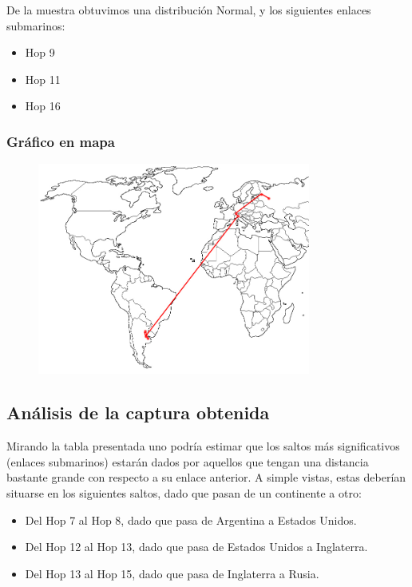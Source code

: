 De la muestra obtuvimos una distribuci\'on Normal, y los siguientes enlaces submarinos:
\begin{itemize}
\item Hop 9
\item Hop 11
\item Hop 16
\end{itemize}

\subsubsection{Gr\'afico en mapa}

\begin{figure}[h]
    \includegraphics[width=0.8\textwidth]{img_analisis1/mapa.jpg}
    
\end{figure}
\vspace{0.25cm}


\subsection{An\'alisis de la captura obtenida}

Mirando la tabla presentada uno podr\'ia estimar que los saltos m\'as significativos (enlaces submarinos) estar\'an dados por aquellos que tengan una distancia bastante grande con respecto a su enlace anterior. A simple vistas, estas deber\'ian situarse en los siguientes saltos, dado que pasan de un continente a otro:
\begin{itemize}
\item Del Hop 7 al Hop 8, dado que pasa de Argentina a Estados Unidos.
\item Del Hop 12 al Hop 13, dado que pasa de Estados Unidos a Inglaterra.
\item Del Hop 13 al Hop 15, dado que pasa de Inglaterra a Rusia.
\end{itemize}

